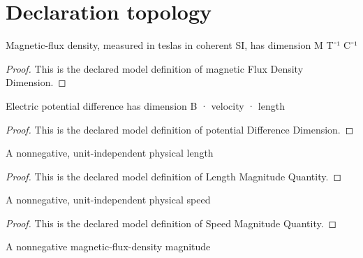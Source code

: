 \section{Declaration topology}
\begin{definition}
  \label{def:physics:phyx-mini-0972:phyxminiproblems-problemphyxmini0972-magneticfluxdensitydimension}
  Magnetic-flux density, measured in teslas in coherent SI, has dimension M T⁻¹ C⁻¹
\end{definition}
\begin{proof}
  This is the declared model definition of magnetic Flux Density Dimension.
\end{proof}
\begin{definition}
  \label{def:physics:phyx-mini-0972:phyxminiproblems-problemphyxmini0972-potentialdifferencedimension}
  Electric potential difference has dimension B · velocity · length
\end{definition}
\begin{proof}
  This is the declared model definition of potential Difference Dimension.
\end{proof}
\begin{definition}
  \label{def:physics:phyx-mini-0972:phyxminiproblems-problemphyxmini0972-lengthmagnitudequantity}
  A nonnegative, unit-independent physical length
\end{definition}
\begin{proof}
  This is the declared model definition of Length Magnitude Quantity.
\end{proof}
\begin{definition}
  \label{def:physics:phyx-mini-0972:phyxminiproblems-problemphyxmini0972-speedmagnitudequantity}
  A nonnegative, unit-independent physical speed
\end{definition}
\begin{proof}
  This is the declared model definition of Speed Magnitude Quantity.
\end{proof}
\begin{definition}
  \label{def:physics:phyx-mini-0972:phyxminiproblems-problemphyxmini0972-magneticfluxdensitymagnitudequantity}
  A nonnegative magnetic-flux-density magnitude
\end{definition}
